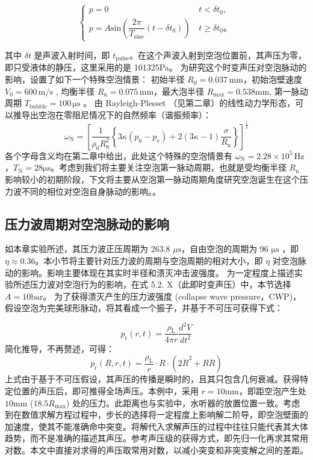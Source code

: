 \begin{equation}
\left\{\begin{array}{lr}
p =0\,&{t <\delta t_0},\\

p =A\mathrm {sin }(\dfrac{2\pi}{T_\mathrm {sine}}(t-\delta t_0))\,&{t \geq \delta t_0}。
\end{array}
\right.
\label{5.2.}
\end{equation}

其中 $\delta t$ 是声波入射时间，即
$t_\mathrm{pulse}$。在这个声波入射到空泡位置前，其声压为零，即只受液体的静压，这里采用的是
101325Pa。
为研究这个时变声压对空泡脉动的影响，设置了如下一个特殊空泡情景：
初始半径 $R_0=0.037\,\mathrm {mm}$，初始泡壁速度
$V_0=600\, \mathrm {m /s}$ , 均衡半径
$R_\mathrm n=0.075\,\mathrm {mm}$，最大泡半径
$R_\mathrm{max}=0.538\mathrm{mm}$, 第一脉动周期
$T_\mathrm {bubble }=100\,\mathrm\mu \mathrm s$ 。 由 Rayleigh-Plesset
（见第二章）的线性动力学形态，可以推导出空泡在零阻尼情况下的自然频率（谐振频率）\cite{brennen_cavitation_2003}： 
$$
\omega_\mathrm N=\left[\frac{1}{\rho_\mathrm{0} R_\mathrm{n}^2}\left\{3 \kappa (p_\mathrm{0}-p_\mathrm{v })+2(3 \kappa-1) \frac{\sigma}{R_\mathrm{n}}\right\}\right]^{\frac{1}{2}}
$$ 
各个字母含义均在第二章中给出，此处这个特殊的空泡情景有
$\omega_\mathrm N=2.28\times 10^5 \,\mathrm{Hz}$
，$T_\mathrm{N}=28\mathrm{\mu s}$。考虑到我们将主要关注空泡第一脉动周期，也就是受均衡半径
$R_\mathrm n$
影响较小的初期阶段，下文将主要从空泡第一脉动周期角度研究空泡诞生在这个压力波不同的相位对空泡自身脉动的影响。。


\subsection{压力波周期对空泡脉动的影响}

如本章实验所述，其压力波正压周期为 263.8
$\mu\mathrm {s}$，自由空泡的周期为 96 $\mathrm {\mu s}$ ，即
$\eta \approx 0.36$。本小节将主要针对压力波的周期与空泡周期的相对大小，即
$\eta$ 对空泡脉动的影响。影响主要体现在其实时半径和溃灭冲击波强度。
为一定程度上描述实验所述压力波对空泡行为的影响，在式 5.2.
X（此即时变声压）中，本节选择 $A=10\mathrm {bar}$。
为了获得溃灭产生的压力波强度 (collapse wave
pressure，CWP)，假设空泡为完美球形脉动，将其看成一个振子，并基于不可压可获得下式\cite{Brennen2003}：

$$p_{\text{r}}(r,t)=\frac{\rho_{\text{L}}}{4\pi r}\frac{d^{2}V}{dt^{2}}$$
简化推导，不再赘述，可得：
$$p_{\text{r}}(R,r,t)=\frac{\rho_{\text{L}}}{r}\cdot R\cdot (2\dot R^{2}+R\ddot R)$$
上式由于基于不可压假设，其声压的传播是瞬时的，且其只包含几何衰减。获得特定位置的声压后，即可推得全场声压。本例中，采用
$r=10\mathrm{mm}$，即距空泡产生处 $10\mathrm{mm}$
($18.5R_\mathrm{max}$)
处的压力。此距离也与实验中，水听器的放置位置一致。考虑到在数值求解方程过程中，步长的选择将一定程度上影响解二阶导，即空泡壁面的加速度，使其不能准确命中突变。将解代入求解声压的过程中往往只能代表其大体趋势，而不是准确的描述其声压。参考声压级的获得方式，即先归一化再求其常用对数。本文中直接对求得的声压取常用对数，以减小突变和非突变解之间的差距。
\medskip
\bigskip
